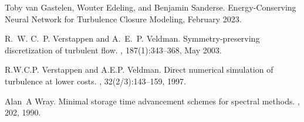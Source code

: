 \documentclass[preprint]{elsarticle}
\begin{document}
\begin{thebibliography}{10}
Toby {van Gastelen}, Wouter Edeling, and Benjamin Sanderse.
\newblock Energy-{{Conserving Neural Network}} for {{Turbulence Closure Modeling}}, February 2023.

R.~W. C.~P. Verstappen and A.~E.~P. Veldman.
\newblock Symmetry-preserving discretization of turbulent flow.
, 187(1):343–368, May 2003.

R.W.C.P. Verstappen and A.E.P. Veldman.
\newblock Direct numerical simulation of turbulence at lower costs.
, 32(2/3):143–159, 1997.

Alan~A Wray.
\newblock Minimal storage time advancement schemes for spectral methods.
, 202, 1990.

\end{thebibliography}
\end{document}
